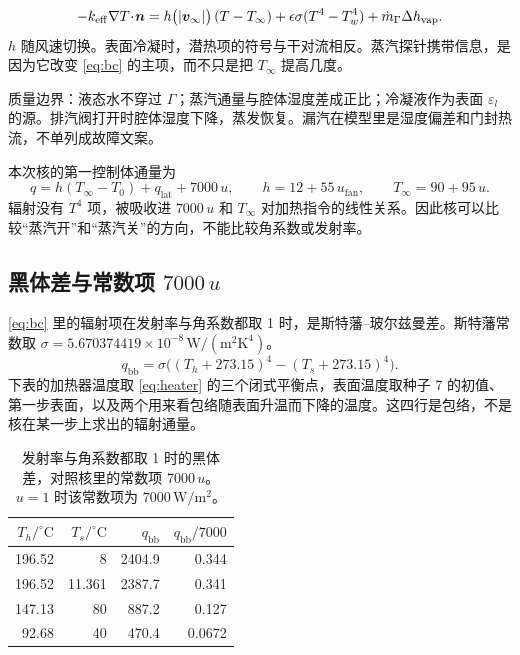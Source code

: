 \begin{equation}
\label{eq:bc}
-k_{\mathrm{eff}}\nabla T\!\cdot\!\bm{n}
=h\big(|\bm{v}_\infty|\big)\,(T-T_\infty)
+\epsilon\sigma(T^4-T_w^4)
+\dot m_{\Gamma}\Delta h_{\mathrm{vap}}.
\end{equation}
\(h\) 随风速切换。表面冷凝时，潜热项的符号与干对流相反。蒸汽探针携带信息，是因为它改变 \eqref{eq:bc} 的主项，而不只是把 \(T_\infty\) 提高几度。

质量边界：液态水不穿过 \(\Gamma\)；蒸汽通量与腔体湿度差成正比；冷凝液作为表面 \(\varepsilon_l\) 的源。排汽阀打开时腔体湿度下降，蒸发恢复。漏汽在模型里是湿度偏差和门封热流，不单列成故障文案。

本次核的第一控制体通量为
\begin{equation}
q=h(T_\infty-T_0)+q_{\mathrm{lat}}+7000\,u,\qquad h=12+55\,u_{\mathrm{fan}},\qquad T_\infty=90+95\,u.
\end{equation}
辐射没有 \(T^4\) 项，被吸收进 \(7000\,u\) 和 \(T_\infty\) 对加热指令的线性关系。因此核可以比较“蒸汽开”和“蒸汽关”的方向，不能比较角系数或发射率。

\subsection{黑体差与常数项 \(7000\,u\)}

\eqref{eq:bc} 里的辐射项在发射率与角系数都取 1 时，是斯特藩–玻尔兹曼差。斯特藩常数取 \(\sigma=5.670374419\times 10^{-8}\,\mathrm{W}/(\mathrm{m}^2\mathrm{K}^4)\)。
\begin{equation}
\label{eq:sb}
q_{\mathrm{bb}}=\sigma\big((T_h+273.15)^4-(T_s+273.15)^4\big).
\end{equation}
下表的加热器温度取 \eqref{eq:heater} 的三个闭式平衡点，表面温度取种子 7 的初值、第一步表面，以及两个用来看包络随表面升温而下降的温度。这四行是包络，不是核在某一步上求出的辐射通量。

\begin{table}[ht]
\centering
\caption{发射率与角系数都取 1 时的黑体差，对照核里的常数项 \(7000\,u\)。\(u=1\) 时该常数项为 \(7000\,\mathrm{W}/\mathrm{m}^2\)。}
\begin{tabular}{rrrr}
\toprule
\(T_h/^\circ\mathrm{C}\) & \(T_s/^\circ\mathrm{C}\) & \(q_{\mathrm{bb}}\) & \(q_{\mathrm{bb}}/7000\) \\
\midrule
196.52 & 8 & 2404.9 & 0.344 \\
196.52 & 11.361 & 2387.7 & 0.341 \\
147.13 & 80 & 887.2 & 0.127 \\
92.68 & 40 & 470.4 & 0.0672 \\
\bottomrule
\end{tabular}
\end{table}

